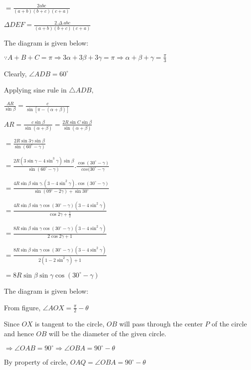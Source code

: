   $= \frac{2abc}{(a + b)(b + c)(c + a)}$

  $\Delta DEF = \frac{2.\Delta .abc}{(a + b)(b + c)(c + a)}$

\item The diagram is given below:

  \startplacefigure
    \externalfigure[20_2.pdf]
  \stopplacefigure

  $\because A + B + C = \pi \Rightarrow 3\alpha + 3\beta + 3\gamma = \pi \Rightarrow \alpha + \beta + \gamma =
  \frac{\pi}{3}$

  Clearly, $\angle ADB = 60^\circ$

  Applying sine rule in $\triangle ADB,$

  $\frac{AR}{\sin\beta} = \frac{c}{\sin[\pi - (\alpha + \beta)]}$

  $AR = \frac{c\sin \beta}{\sin(\alpha + \beta)} = \frac{2R\sin C\sin\beta}{\sin(\alpha + \beta)}$

  $= \frac{2R\sin3\gamma\sin\beta}{\sin(60^\circ - \gamma)}$

  $= \frac{2R(3\sin\gamma - 4\sin^3\gamma)\sin\beta}{\sin(60^\circ - \gamma)}.\frac{\cos(30^\circ -
    \gamma)}{cos(30^\circ - \gamma}$

  $= \frac{4R\sin\beta\sin\gamma.(3 - 4\sin^2\gamma).\cos(30^\circ - \gamma)}{\sin(09^\circ - 2\gamma) + \sin 30^\circ}$

  $= \frac{4R\sin\beta\sin\gamma\cos(30^\circ - \gamma)(3 - 4\sin^2\gamma)}{\cos2\gamma + \frac{1}{2}}$

  $= \frac{8R\sin\beta\sin\gamma\cos(30^\circ - \gamma)(3 - 4\sin^2\gamma)}{2\cos2\gamma + 1}$

  $= \frac{8R\sin\beta\sin\gamma\cos(30^\circ - \gamma)(3 - 4\sin^2\gamma)}{2(1 - 2\sin^2\gamma) + 1}$

  $= 8R\sin\beta\sin\gamma\cos(30^\circ - \gamma)$

\item The diagram is given below:

  \startplacefigure
    \externalfigure[20_3.pdf]
  \stopplacefigure

  From figure, $\angle AOX = \frac{\pi}{2} - \theta$

  Since $OX$ is tangent to the circle, $OB$ will pass through the center $P$ of the circle and hence
  $OB$ will be the diameter of the given circle.

  $\Rightarrow \angle OAB = 90^\circ \Rightarrow \angle OBA = 90^\circ - \theta$

  By property of circle, $OAQ = \angle OBA = 90^\circ - \theta$

